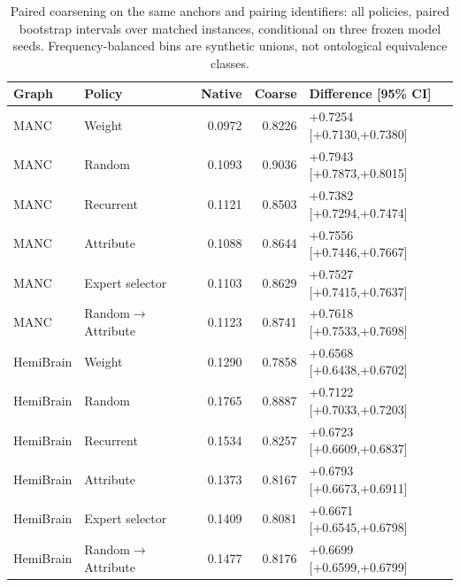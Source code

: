 \begin{table}[h]
\centering\scriptsize
\setlength{\tabcolsep}{3pt}
\caption{Paired coarsening on the same anchors and pairing identifiers: all policies, paired bootstrap intervals over matched instances, conditional on three frozen model seeds. Frequency-balanced bins are synthetic unions, not ontological equivalence classes.}
\label{tab:coarse-paired}
\begin{tabular}{llrrl}
\toprule
Graph & Policy & Native & Coarse & Difference [95\% CI] \\
\midrule
MANC & Weight & 0.0972 & 0.8226 & +0.7254 [+0.7130,+0.7380] \\
MANC & Random & 0.1093 & 0.9036 & +0.7943 [+0.7873,+0.8015] \\
MANC & Recurrent & 0.1121 & 0.8503 & +0.7382 [+0.7294,+0.7474] \\
MANC & Attribute & 0.1088 & 0.8644 & +0.7556 [+0.7446,+0.7667] \\
MANC & Expert selector & 0.1103 & 0.8629 & +0.7527 [+0.7415,+0.7637] \\
MANC & Random$\to$Attribute & 0.1123 & 0.8741 & +0.7618 [+0.7533,+0.7698] \\
HemiBrain & Weight & 0.1290 & 0.7858 & +0.6568 [+0.6438,+0.6702] \\
HemiBrain & Random & 0.1765 & 0.8887 & +0.7122 [+0.7033,+0.7203] \\
HemiBrain & Recurrent & 0.1534 & 0.8257 & +0.6723 [+0.6609,+0.6837] \\
HemiBrain & Attribute & 0.1373 & 0.8167 & +0.6793 [+0.6673,+0.6911] \\
HemiBrain & Expert selector & 0.1409 & 0.8081 & +0.6671 [+0.6545,+0.6798] \\
HemiBrain & Random$\to$Attribute & 0.1477 & 0.8176 & +0.6699 [+0.6599,+0.6799] \\
\bottomrule
\end{tabular}
\end{table}
